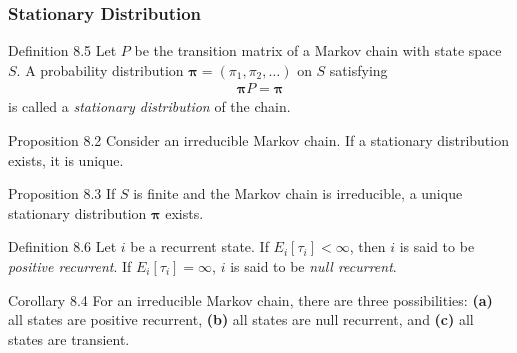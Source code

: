 \subsubsection{Stationary Distribution}
\begin{boks}{Definition 8.5}
  Let $P$ be the transition matrix of a Markov chain with state space $S$. A probability distribution $\boldsymbol{\pi} = (\pi_1, \pi_2, \ldots)$ on $S$ satisfying
  \begin{align*}
    \boldsymbol{\pi} P = \boldsymbol{\pi}
  \end{align*}
  is called a \textit{stationary distribution} of the chain.
\end{boks}
\begin{boks}{Proposition 8.2}
  Consider an irreducible Markov chain. If a stationary distribution exists, it is unique.
\end{boks}
\begin{boks}{Proposition 8.3}
  If $S$ is finite and the Markov chain is irreducible, a unique stationary distribution $\boldsymbol{\pi}$ exists.
\end{boks}
\begin{boks}{Definition 8.6}
  Let $i$ be a recurrent state. If $E_i[\tau_i] < \infty$, then $i$ is said to be \textit{positive recurrent}. If $E_i[\tau_i] = \infty$, $i$ is said to be \textit{null recurrent}.
\end{boks}
\begin{boks}{Corollary 8.4}
  For an irreducible Markov chain, there are three possibilities: \textbf{(a)} all states are positive recurrent, \textbf{(b)} all states are null recurrent, and \textbf{(c)} all states are transient.
\end{boks}

